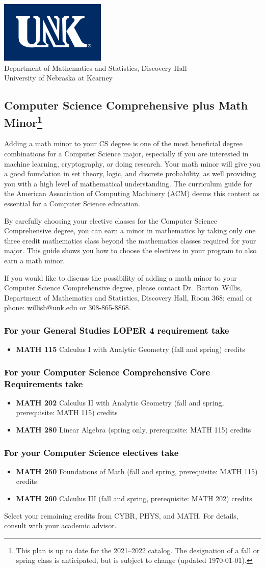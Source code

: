 \documentclass[10pt]{article}
\makeatletter
\newenvironment{mypar}[2]
   {\begin{list}{}%
     {\setlength\leftmargin{#1}
     \setlength\rightmargin{#2}}
     \item[]}
   {\end{list}}
\newcommand{\calcone}{\textbf{MATH 115} Calculus I with Analytic Geometry (fall and spring) \dotfill 5 credits}
\newcommand{\calctwo}{\textbf{MATH 202} Calculus II with Analytic Geometry (fall and spring, prerequisite: MATH 115) \dotfill 5 credits }
\newcommand{\foundations}{\textbf{MATH 250} Foundations of Math (fall and spring, prerequisite: MATH 115)  \dotfill 3 credits}
\newcommand{\calcthree}{\textbf{MATH 260} Calculus III  (fall and spring, prerequisite: MATH 202) \dotfill 5 credits}
\newcommand{\linear}{\textbf{MATH 280} Linear Algebra (spring only, prerequisite: MATH 115) \dotfill 3 credits}
\newcommand{\contactbw}{\mbox{Dr.\ Barton Willis}, Department of Mathematics and Statistics,  Discovery Hall, Room 368;
email or phone: \href{mailto:willisb@unk.edu}{willisb@unk.edu} or 308-865-8868.}
\newcommand{\forinfo}[2]{If you would like to discuss the possibility of adding a math {#1} to your {#2}, please contact \contactbw}
\newcommand{\catalog}{2021--2022 }
\newcommand{\myfootnote}{\footnote{This plan is up to date for  the \catalog catalog. The designation of a fall or spring class is 
anticipated, but  is subject to change (updated  \today).}}
\newcommand{\myheading}{
\begin{flushleft}
\includegraphics[scale=0.35]{unk-logo}\\
\setcounter{footnote}{0}
\vspace{0.25in}
 \textcolor{unkblue}{Department of Mathematics and Statistics, Discovery Hall} \\
  \textcolor{unkblue}{University of Nebraska at Kearney}
\end{flushleft}}
\makeatother
\begin{document}
\myheading


\subsection*{\textbf{\textcolor{unkblue}{Computer Science Comprehensive plus Math Minor\myfootnote}}}


Adding a math minor to your CS degree is one of the most beneficial degree combinations for a Computer Science major, especially if you are interested in machine learning, cryptography,  or doing research.  Your math minor will give you a good foundation in set theory, logic, and discrete probability, as well providing you with a high level of mathematical understanding. The curriculum guide for the American Association of Computing Machinery (ACM) deems  this
content  as essential for  a Computer Science education.

 By carefully choosing your elective classes for the Computer Science Comprehensive degree, you can earn a minor in mathematics by taking only one three credit mathematics class beyond the mathematics classes required for your major.  This guide shows you how to choose the electives in your program to also earn a math minor.

\forinfo{minor}{Computer Science Comprehensive degree}

\vspace{-0.1in}

\subsubsection*{\textcolor{black}{For  your General Studies LOPER 4 requirement take}}
\begin{itemize}
\item  \calcone
\end{itemize}

\vspace{-0.1in}
\subsubsection*{\textcolor{black}{For your Computer Science Comprehensive Core Requirements take}}
\begin{itemize}
\item \calctwo
\item \linear
\end{itemize}

\vspace{-0.1in}
\subsubsection*{\textcolor{black}{For your Computer Science electives take}}
\begin{itemize}
\item \foundations
\item \calcthree
\end{itemize}
\vspace{-0.1in}
\begin{mypar}{0.5cm}{0.5cm} Select your remaining credits from CYBR, PHYS,  and MATH. For details, consult with your 
   academic advisor.
\end{mypar}
\vspace{-0.2in}
\end{document}
